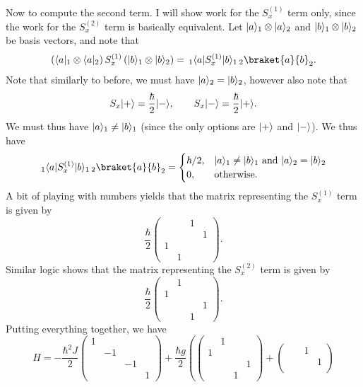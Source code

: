 \documentclass[11pt, letterpaper]{article}
\begin{document}
\begin{enumerate}
		Now to compute the second term. I will show work for the $S_x^{(1)} $ term only, since the work for the $S_x^{(2)} $ term is basically equivalent. Let $\lvert a\rangle_1 \otimes \lvert a\rangle_2$ and $\lvert b\rangle _1 \otimes \lvert b\rangle _2$ be basis vectors, and note that
		\[
			\left( \bra{a}_1 \otimes \bra{a}_2 \right) S_x^{(1)} \left( \ket{b}_1 \otimes \ket{b}_2 \right) =\,_1\bra{a}S_x^{(1)} \ket{b}_1\,_2\braket{a}{b}_2
		.\]
Note that similarly to before, we must have $\lvert a\rangle_2=\lvert b\rangle_2$, however also note that
\[
	S_x \lvert+\rangle =\frac{\hbar }{2} \lvert-\rangle ,\qquad S_x \lvert-\rangle =\frac{\hbar }{2} \lvert+\rangle 
.\]
We must thus have $\lvert a\rangle_1 \neq \lvert b\rangle_1$ (since the only options are $\lvert+\rangle$ and $\lvert-\rangle $). We thus have
\[
	\,_1\bra{a} S_x^{(1)} \ket{b}_1\,_2\braket{a}{b} _2=
	\begin{cases}
		\hbar /2,&\ket{a}_1 \neq \ket{b}_1 \text{ and } \ket{a}_2=\ket{b} _2\\
		0,&\text{otherwise.} 
	\end{cases}
\]
A bit of playing with numbers yields that the matrix representing the $S_x^{(1)} $ term is given by
\[
	\frac{\hbar }{2} \begin{pmatrix}
	&  & 1 &  \\
	 &  &  & 1 \\
	1 &  &  &  \\
	 & 1 &  & 
	\end{pmatrix}
.\]
Similar logic shows that the matrix representing the $S_x^{(2)} $ term is given by
\[
	\frac{\hbar }{2} \begin{pmatrix}
	 & 1 &  &  \\
	1 &  &  &  \\
	 &  &  & 1 \\
	 &  & 1 & 
	\end{pmatrix}
.\]
Putting everything together, we have
\[
	H=-\frac{\hbar^2 J}{2} \begin{pmatrix}
	1 &  &  &  \\
	 & -1 &  &  \\
	 &  & -1 &  \\
	 &  &  & 1
	\end{pmatrix}+\frac{\hbar g}{2} \left( \begin{pmatrix}
	 & 1 &  &  \\
	1 &  &  &  \\
	 &  &  & 1 \\
	 &  & 1 & 
	\end{pmatrix}+\begin{pmatrix}
	 &  & 1 &  \\
	 &  &  & 1 \\

\end{pmatrix}\]
\end{enumerate}
\end{document}
